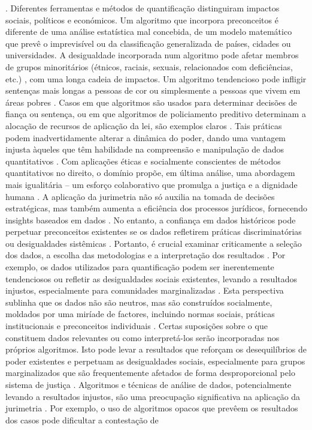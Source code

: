 \cite{10.1590/dados.2022.65.3.267,10.3390/fi9040068}. Diferentes ferramentas e métodos de quantificação distinguiram impactos sociais, políticos e económicos. Um algoritmo que incorpora preconceitos é diferente de uma análise estatística mal concebida, de um modelo matemático que prevê o imprevisível ou da classificação generalizada de países, cidades ou universidades. A desigualdade incorporada num algoritmo pode afetar membros de grupos minoritários (étnicos, raciais, sexuais, relacionados com deficiências, etc.) \cite{danaher2017}, com uma longa cadeia de impactos. Um algoritmo tendencioso pode infligir sentenças mais longas a pessoas de cor ou simplesmente a pessoas que vivem em áreas pobres \cite{10.1590/dados.2022.65.3.267,1023071190721}. Casos em que algoritmos são usados para determinar decisões de fiança ou sentença, ou em que algoritmos de policiamento preditivo determinam a alocação de recursos de aplicação da lei, são exemplos claros \cite{10.1590/dados.2022.65.3.267,1023071190721}. Tais práticas podem inadvertidamente alterar a dinâmica do poder, dando uma vantagem injusta àqueles que têm habilidade na compreensão e manipulação de dados quantitativos \cite{10.1590/dados.2022.65.3.267,1023071190721}. Com aplicações éticas e socialmente conscientes de métodos quantitativos no direito, o domínio propõe, em última análise, uma abordagem mais igualitária – um esforço colaborativo que promulga a justiça e a dignidade humana \cite{10.1007/s11186-021}. A aplicação da jurimetria não só auxilia na tomada de decisões estratégicas, mas também aumenta a eficiência dos processos jurídicos, fornecendo insights baseados em dados \cite{silva2023role,103390fi9040068}. No entanto, a confiança em dados históricos pode perpetuar preconceitos existentes se os dados refletirem práticas discriminatórias ou desigualdades sistêmicas \cite{10.1590/dados.2022.65.3.267,10.1057/s41599-020-0396-5}. Portanto, é crucial examinar criticamente a seleção dos dados, a escolha das metodologias e a interpretação dos resultados \cite{10.1590/dados.2022.65.3.267,10.32586/rcda.v18i1.585}. Por exemplo, os dados utilizados para quantificação podem ser inerentemente tendenciosos ou refletir as desigualdades sociais existentes, levando a resultados injustos, especialmente para comunidades marginalizadas \cite{10.1590/dados.2022.65.3.267,10.1057/s41599-020-00557-0}. Esta perspectiva sublinha que os dados não são neutros, mas são construídos socialmente, moldados por uma miríade de factores, incluindo normas sociais, práticas institucionais e preconceitos individuais \cite{10.1057/s41599-020-00557-0,salais2016quantification}. Certas suposições sobre o que constituem dados relevantes ou como interpretá-los serão incorporadas nos próprios algoritmos. Isto pode levar a resultados que reforçam os desequilíbrios de poder existentes e perpetuam as desigualdades sociais, especialmente para grupos marginalizados que são frequentemente afetados de forma desproporcional pelo sistema de justiça \cite{taylor2018}. Algoritmos e técnicas de análise de dados, potencialmente levando a resultados injustos, são uma preocupação significativa na aplicação da jurimetria \cite{10.1590/dados.2022.65.3.267,10.3390/fi9040068}. Por exemplo, o uso de algoritmos opacos que prevêem os resultados dos casos pode dificultar a contestação de 